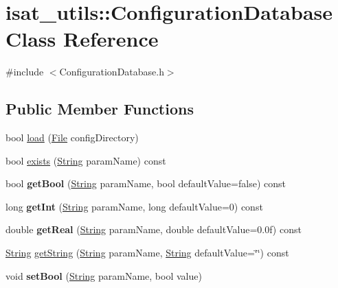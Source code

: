 \hypertarget{classisat__utils_1_1_configuration_database}{}\section{isat\+\_\+utils\+:\+:Configuration\+Database Class Reference}
\label{classisat__utils_1_1_configuration_database}


{\ttfamily \#include $<$Configuration\+Database.\+h$>$}

\subsection*{Public Member Functions}
\begin{DoxyCompactItemize}
\item 
bool \hyperlink{classisat__utils_1_1_configuration_database_afc0a79457de05c204ee8b8381646d5c6}{load} (\hyperlink{classisat__utils_1_1_file}{File} config\+Directory)
\item 
bool \hyperlink{classisat__utils_1_1_configuration_database_a33e1432c59eef927e6a7edcd94c6b7fe}{exists} (\hyperlink{classisat__utils_1_1_string}{String} param\+Name) const 
\item 
bool {\bfseries get\+Bool} (\hyperlink{classisat__utils_1_1_string}{String} param\+Name, bool default\+Value=false) const \hypertarget{classisat__utils_1_1_configuration_database_a97df465d1b0b77ff1d2f5b072cfd5a00}{}\label{classisat__utils_1_1_configuration_database_a97df465d1b0b77ff1d2f5b072cfd5a00}

\item 
long {\bfseries get\+Int} (\hyperlink{classisat__utils_1_1_string}{String} param\+Name, long default\+Value=0) const \hypertarget{classisat__utils_1_1_configuration_database_a263c773df281c83d8356b9eb54078a1f}{}\label{classisat__utils_1_1_configuration_database_a263c773df281c83d8356b9eb54078a1f}

\item 
double {\bfseries get\+Real} (\hyperlink{classisat__utils_1_1_string}{String} param\+Name, double default\+Value=0.\+0f) const \hypertarget{classisat__utils_1_1_configuration_database_ae2c0eb4bb1c6f6f414fb0cff369c22df}{}\label{classisat__utils_1_1_configuration_database_ae2c0eb4bb1c6f6f414fb0cff369c22df}

\item 
\hyperlink{classisat__utils_1_1_string}{String} \hyperlink{classisat__utils_1_1_configuration_database_a284544bd461710785a45f45144e83000}{get\+String} (\hyperlink{classisat__utils_1_1_string}{String} param\+Name, \hyperlink{classisat__utils_1_1_string}{String} default\+Value=\char`\"{}\char`\"{}) const 
\item 
void {\bfseries set\+Bool} (\hyperlink{classisat__utils_1_1_string}{String} param\+Name, bool value)\hypertarget{classisat__utils_1_1_configuration_database_a27569866fd1119f2cdb4071e3e3f30cb}{}\label{classisat__utils_1_1_configuration_database_a27569866fd1119f2cdb4071e3e3f30cb}


\end{DoxyCompactItemize}
